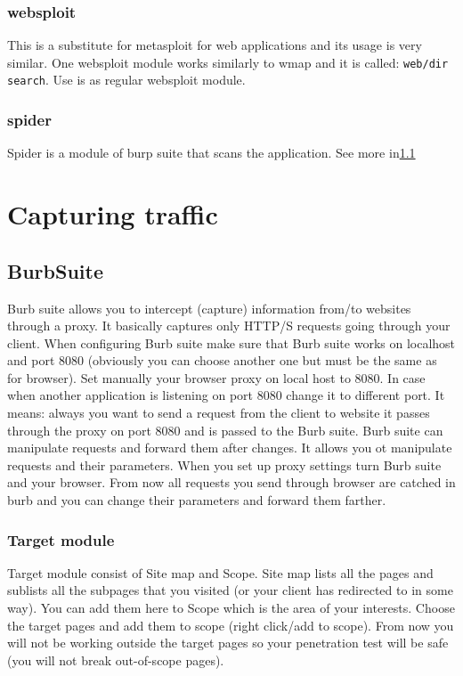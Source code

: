 \documentclass{article}[12pt]
\begin{document}
\subsubsection{websploit}

This is a substitute for metasploit for web applications and its usage is very similar.
One websploit module works similarly to wmap and it is called: \texttt{web/dir search}.
Use is as regular websploit module.

\subsubsection{spider}
Spider is a module of burp suite that scans the application.
See more in\ref{subsec:burp}




%
%

\section{Capturing traffic}
\label{sec:traffic}

\subsection{BurbSuite}
\label{subsec:burp}

Burb suite allows you to intercept (capture) information from/to websites through a proxy.
It basically captures only HTTP/S requests going through your client.
When configuring Burb suite make sure that Burb suite works on localhost and port 8080 (obviously you can choose another one but must be the same as for browser).
Set manually your browser proxy on local host to 8080.
In case when another application is listening on port 8080 change it to different port.
It means: always you want to send a request from the client to website it passes through the proxy on port 8080 and is passed to the Burb suite.
Burb suite can manipulate requests and forward them after changes.
It allows you ot manipulate requests and their parameters.
When you set up proxy settings turn Burb suite and your browser.
From now all requests you send through browser are catched in burb and you can change their parameters and forward them farther.

\subsubsection{Target module}
Target module consist of Site map and Scope.
Site map lists all the pages and sublists all the subpages that you visited (or your client has redirected to in some way).
You can add them here to Scope which is the area of your interests.
Choose the target pages and add them to scope (right click/add to scope).
From now you will not be working outside the target pages so your penetration test will be safe (you will not break out-of-scope pages).
\end{document}
